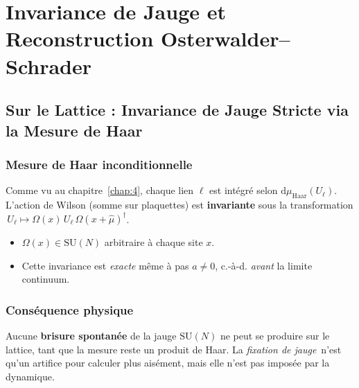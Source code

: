 \chapter{Invariance de Jauge et Reconstruction Osterwalder--Schrader}
\label{chap:8}

\section{Sur le Lattice : Invariance de Jauge Stricte via la Mesure de Haar}
\label{sec:8.1}

\subsection*{Mesure de Haar inconditionnelle}
Comme vu au chapitre~\ref{chap:4}, chaque lien \(\ell\) est intégré selon \(\mathrm{d}\mu_{\mathrm{Haar}}(U_\ell)\). L’action de Wilson (somme sur plaquettes) est \textbf{invariante} sous la transformation \(\,U_\ell \mapsto \Omega(x)\,U_\ell\,\Omega(x+\hat{\mu})^\dagger\).  
\begin{itemize}
	\item \(\Omega(x)\in \mathrm{SU}(N)\) arbitraire à chaque site \(x\).  
	\item Cette invariance est \emph{exacte} même à pas \(a\neq 0\), c.-à-d. \emph{avant} la limite continuum.
\end{itemize}

\subsection*{Conséquence physique}
Aucune \textbf{brisure spontanée} de la jauge \(\mathrm{SU}(N)\) ne peut se produire sur le lattice, tant que la mesure reste un produit de Haar. La \og \emph{fixation de jauge}\fg\ n’est qu’un artifice pour calculer plus aisément, mais elle n’est pas imposée par la dynamique.

\vspace{1em}

